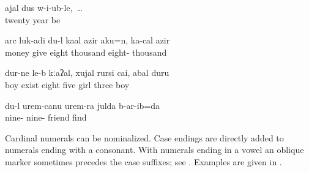 \ea\label{ex:whenIwas20yearsold}
\gll	\vuvfr ajal dus w-i\uvfr-ub-le,~\ldots\\
	twenty year be\\
\glt	{}
\z

\ea\label{ex:Iwouldhavegivenhimmoney}
\gll	arc luk\lmk-adi du-l k\lmk a\glpl al azir ak\lmk u=n, k\lmk a\glpl-c\ej al azir\\
	money give  eight thousand  eight- thousand\\
\glt	{}
\z

\ea\label{ex:childrenarethere10}
\gll	dur\phfr-ne le-b kːaʔal, xujal rurs\lmk i cai, \eppl a\pha bal dur\phfr u\pha\\
	boy exist eight five girl  three boy\\
\glt	{}
\z

\ea\label{ex:Ifound99friends}
\gll	du-l ur\paaf\ej em-c\ej anu ur\paaf\ej em-ra {julda\pafr} b-ar\paaf\lmk-ib=da\\
	 nine- nine- friend find\\
\glt	{}
\z

Cardinal numerals can be nominalized. Case endings are directly added to numerals ending with a consonant. With numerals ending in a vowel an oblique marker  sometimes precedes the case suffixes; see . Examples are given in .


